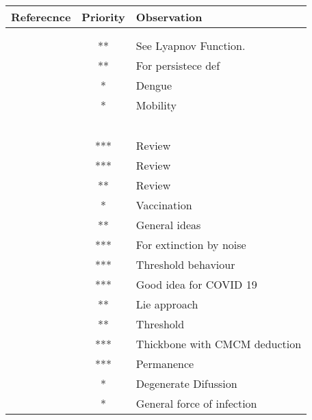 %
\begin{table}
	\begin{tabular}{rcl} 
		\toprule
			Referecnce
			&
			Priority
			&
			Observation
		\\
		\midrule
		\\
		\cite{Zhao2013}
		\\
		\cite{Zhang2017a}	&	**  & See Lyapnov Function.
		\\
		\cite{Liu2018a} &       **  & For persistece def
		\\
		\cite{Liu2018d} &        *   & Dengue
		\\
		\cite{Cai2017a} &        *   & Mobility	
		\\
		\cite{Lu2009} & 
		\\
		\cite{ElFatini2018}
		\\
		\cite{Liu2019b}
		\\
		\cite{Lahrouz2017a}
		\\
		\cite{Wang2018a}
		\\
		\cite{Cao2016a} 	& *** & Review
		\\
		\cite{Tang2015} 	& *** & Review
		\\
		\cite{Ji2014} 		& ** &Review
		\\
		\cite{Liu2018b} 	& * & Vaccination
		\\
		\cite{Cai2015} 		& ** & General ideas
		\\
		\cite{Zhang2018a} 	& *** & For extinction by noise
		\\
		\cite{Zhao2014} 	& *** & Threshold behaviour
		\\
		\cite{Chang2017}    & *** & Good idea for COVID 19
		\\		
		\cite{Dieu2018}     & ** & Lie approach		
		\\
		\cite{Lin2014a}     & **  & Threshold
		\\
		\cite{Maliyoni2017} & ***  	&	 Thickbone with CMCM deduction
		\\
		\cite{Qiu2013}		& ***   &	 Permanence
		\\
		\cite{Lin2017a}		&	*   &	Degenerate Difussion
		\\
		\cite{Cai2013}		&	*   &	General force of infection 
		\\
		\bottomrule
	\end{tabular}
\end{table}
{}
